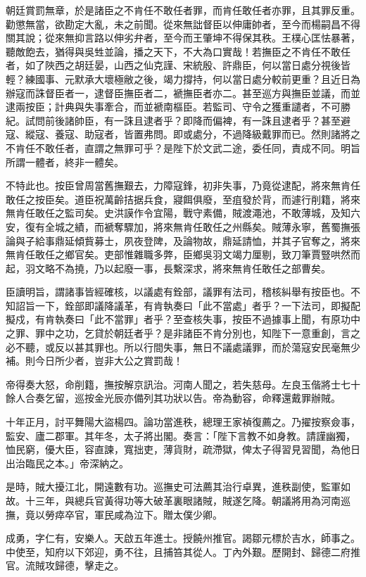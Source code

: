\begin{pinyinscope}
朝廷賞罰無章，於是諸臣之不肯任不敢任者罪，而肯任敢任者亦罪，且其罪反重。勸懲無當，欲勘定大亂，未之前聞。從來無詘督臣以伸庸帥者，至今而楊嗣昌不得關其說；從來無抑言路以伸劣弁者，至今而王肇坤不得保其秩。王樸心匡怯暴著，聽敵飽去，猶得與吳甡並論，播之天下，不大為口實哉！若撫臣之不肯任不敢任者，如了陜西之胡廷晏，山西之仙克謹、宋統殷、許鼎臣，何以當日處分視後皆輕？練國事、元默承大壞極敝之後，竭力撐持，何以當日處分較前更重？且近日為辦寇而誅督臣者一，逮督臣撫臣者二，褫撫臣者亦二。甚至巡方與撫臣並議，而並逮兩按臣；計典與失事牽合，而並褫南樞臣。若監司、守令之獲重譴者，不可勝紀。試問前後諸帥臣，有一誅且逮者乎？即降而偏裨，有一誅且逮者乎？甚至避寇、縱寇、養寇、助寇者，皆置弗問。即或處分，不過降級戴罪而已。然則諸將之不肯任不敢任者，直謂之無罪可乎？是陛下於文武二途，委任同，責成不同。明旨所謂一體者，終非一體矣。

不特此也。按臣曾周當舊撫艱去，力障寇鋒，初非失事，乃竟從逮配，將來無肯任敢任之按臣矣。道臣祝萬齡拮据兵食，寢餌俱廢，至疽發於背，而遽行削籍，將來無肯任敢任之監司矣。史洪謨作令宜陽，戰守素備，賊渡澠池，不敢薄城，及知六安，復有全城之績，而褫奪驟加，將來無肯任敢任之州縣矣。賊薄永寧，舊蜀撫張論與子給事鼎延傾貲募士，夙夜登陴，及論物故，鼎延請恤，并其子官奪之，將來無肯任敢任之鄉官矣。吏部惟雜職多弊，臣鄉吳羽文竭力厘剔，致刀筆賈豎哄然而起，羽文略不為撓，乃以起廢一事，長繫深求，將來無肯任敢任之部曹矣。

臣讀明旨，謂諸事皆經確核，以議處有銓部，議罪有法司，稽核糾舉有按臣也。不知詔旨一下，銓部即議降議革，有肯執奏曰「此不當處」者乎？一下法司，即擬配擬戍，有肯執奏曰「此不當罪」者乎？至查核失事，按臣不過據事上聞，有原功中之罪、罪中之功，乞貸於朝廷者乎？是非諸臣不肯分別也，知陛下一意重創，言之必不聽，或反以甚其罪也。所以行間失事，無日不議處議罪，而於蕩寇安民毫無少補。則今日所少者，豈非大公之賞罰哉！

帝得奏大怒，命削籍，撫按解京訊治。河南人聞之，若失慈母。左良玉偕將士七十餘人合奏乞留，巡按金光辰亦備列其功狀以告。帝為動容，命釋還戴罪辦賊。

十年正月，討平舞陽大盜楊四。論功當進秩，總理王家禎復薦之。乃擢按察僉事，監安、廬二郡軍。其年冬，太子將出閣。奏言：「陛下言教不如身教。請謹幽獨，恤民窮，優大臣，容直諫，寬拙吏，薄貨財，疏滯獄，俾太子得習見習聞，為他日出治臨民之本。」帝深納之。

是時，賊大擾江北，開遠數有功。巡撫史可法薦其治行卓異，進秩副使，監軍如故。十三年，與總兵官黃得功等大破革裏眼諸賊，賊遂乞降。朝議將用為河南巡撫，竟以勞瘁卒官，軍民咸為泣下。贈太僕少卿。

成勇，字仁有，安樂人。天啟五年進士。授饒州推官。謁鄒元標於吉水，師事之。中使至，知府以下郊迎，勇不往，且捕笞其從人。丁內外艱。歷開封、歸德二府推官。流賊攻歸德，擊走之。


\end{pinyinscope}
